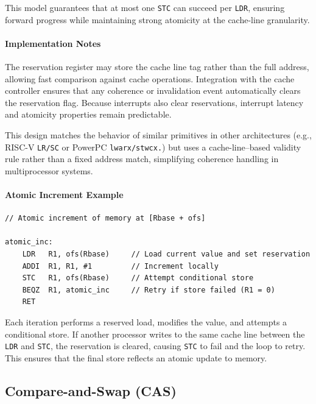 This model guarantees that at most one \texttt{STC} can succeed per \texttt{LDR}, ensuring forward progress while maintaining strong atomicity at the cache-line granularity.

\paragraph{Implementation Notes}

The reservation register may store the cache line tag rather than the full address, allowing fast comparison against cache operations. Integration with the cache controller ensures that any coherence or invalidation event automatically clears the reservation flag. Because interrupts also clear reservations, interrupt latency and atomicity properties remain predictable.

This design matches the behavior of similar primitives in other architectures (e.g., RISC-V \texttt{LR/SC} or PowerPC \texttt{lwarx/stwcx.}) but uses a cache-line–based validity rule rather than a fixed address match, simplifying coherence handling in multiprocessor systems.

\paragraph{Atomic Increment Example}



\smallskip
\begin{lstlisting}
// Atomic increment of memory at [Rbase + ofs]

atomic_inc:
    LDR   R1, ofs(Rbase)     // Load current value and set reservation
    ADDI  R1, R1, #1         // Increment locally
    STC   R1, ofs(Rbase)     // Attempt conditional store
    BEQZ  R1, atomic_inc     // Retry if store failed (R1 = 0)
    RET
\end{lstlisting}

Each iteration performs a reserved load, modifies the value, and attempts a conditional store.  
If another processor writes to the same cache line between the \texttt{LDR} and \texttt{STC}, the reservation is cleared, causing \texttt{STC} to fail and the loop to retry.  
This ensures that the final store reflects an atomic update to memory.

\subsection*{Compare-and-Swap (CAS)}

